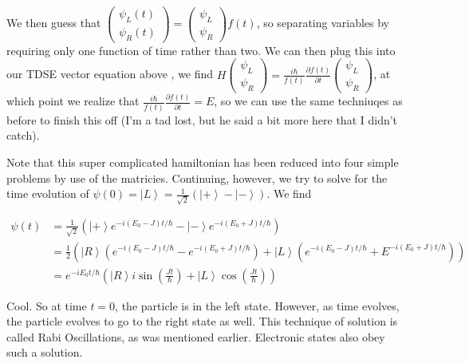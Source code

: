\documentclass{report}
\begin{document}
We then guess that $\begin{pmatrix}\psi_L(t)\\\psi_R(t)\end{pmatrix} = \begin{pmatrix}\psi_L\\\psi_R\end{pmatrix}f(t)$, so separating variables by requiring only one function of time rather than two. We can then plug this into our TDSE vector equation above , we find $H\begin{pmatrix}\psi_L\\\psi_R\end{pmatrix} = \frac{i\hbar}{f(t)}\frac{\partial f(t)}{\partial t}\begin{pmatrix}\psi_L\\\psi_R\end{pmatrix}$, at which point we realize that $\frac{i\hbar}{f(t)}\frac{\partial f(t)}{\partial t} = E$, so we can use the same techniuqes as before to finish this off (I'm a tad lost, but he said a bit more here that I didn't catch).

 Note that this super complicated hamiltonian has been reduced into four simple problems by use of the matricies. Continuing, however, we try to solve for the time evolution of $\psi(0) = \left|L\right> = \frac{1}{\sqrt{2}}\left(\left|+\right> - \left|-\right>\right)$. We find 

\begin{align*}
\psi(t) &= \frac{1}{\sqrt{2}}\left(\left|+\right>e^{-i(E_0-J)t/\hbar} - \left|-\right>e^{-i(E_0+J)t/\hbar}\right)\\
&= \frac{1}{2}\left(\left|R\right> \left(e^{-i(E_0 - J)t/\hbar}-e^{-i(E_0+J)t/\hbar}\right) + \left|L\right>\left(e^{-i(E_0-J)t/\hbar} + E^{-i(E_0+J)t/\hbar}\right)\right)\\
&= e^{-iE_0t/\hbar}\left(\left|R\right>i\sin\left(\frac{Jt}{\hbar}\right) + \left|L\right>\cos\left(\frac{Jt}{\hbar}\right)\right)
\end{align*}

Cool. So at time $t=0$, the particle is in the left state. However, as time evolves, the particle evolves to go to the right state as well. This technique of solution is called Rabi Oscillations, as was mentioned earlier. Electronic states also obey such a solution.
\end{document}

